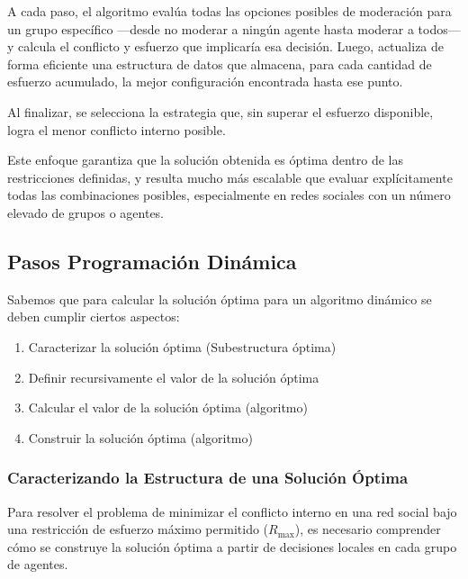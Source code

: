 \documentclass[11pt,letter]{article}
\begin{document}
A cada paso, el algoritmo evalúa todas las opciones posibles de moderación para un grupo específico —desde no moderar a ningún agente hasta moderar a todos— y calcula el conflicto y esfuerzo que implicaría esa decisión. Luego, actualiza de forma eficiente una estructura de datos que almacena, para cada cantidad de esfuerzo acumulado, la mejor configuración encontrada hasta ese punto.

Al finalizar, se selecciona la estrategia que, sin superar el esfuerzo disponible, logra el menor conflicto interno posible.

Este enfoque garantiza que la solución obtenida es óptima dentro de las restricciones definidas, y resulta mucho más escalable que evaluar explícitamente todas las combinaciones posibles, especialmente en redes sociales con un número elevado de grupos o agentes.

\subsection{Pasos Programación Dinámica}
Sabemos que para calcular la solución óptima para un algoritmo dinámico se deben
cumplir ciertos aspectos:
\begin{enumerate}
    \item Caracterizar la solución óptima (Subestructura óptima)
    \item Definir recursivamente el valor de la solución óptima
    \item Calcular el valor de la solución óptima (algoritmo)
    \item Construir la solución óptima (algoritmo)
\end{enumerate}

\subsubsection{Caracterizando la Estructura de una Solución Óptima}

Para resolver el problema de minimizar el conflicto interno en una red social bajo una restricción de esfuerzo máximo permitido ($R_{\text{max}}$), es necesario comprender cómo se construye la solución óptima a partir de decisiones locales en cada grupo de agentes.
\end{document}
